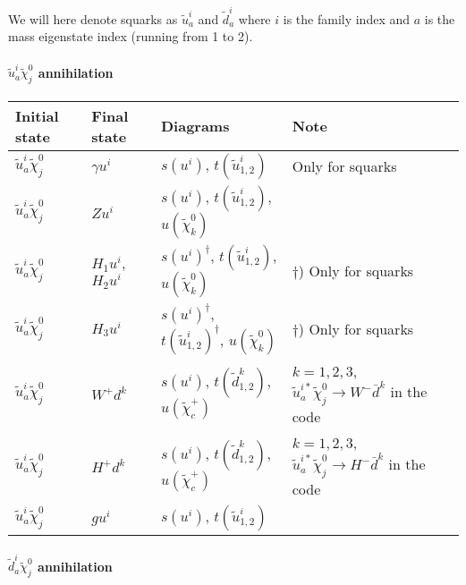 \smallskip


We will here denote squarks as $\tilde{u}^i_a$ and $\tilde{d}^i_a$ where $i$ is the family index and $a$ is the mass eigenstate index (running from 1 to 2).

\paragraph{$\tilde{u}^i_{a} \tilde{\chi}_{j}^{0}$ annihilation}

\begin{center}
\begin{tabular}{llll} \hline
{\bfseries Initial state} & {\bfseries Final state} &
{\bfseries Diagrams} & {\bfseries Note} \\ \hline \tabspace
$\tilde{u}^i_a \tilde{\chi}_{j}^0$ & $\gamma u^i$ &
$s(u^{i})$, $t(\tilde{u}^i_{1,2})$ 
& Only for squarks \\
$\tilde{u}^i_a \tilde{\chi}_{j}^0$ & $Z u^i$ &
$s(u^{i})$, $t(\tilde{u}^i_{1,2})$, $u(\tilde{\chi}_k^0)$ \\
$\tilde{u}^i_a \tilde{\chi}_{j}^0$ & $H_{1} u^i$, $H_{2} u^i$ &
$s(u^{i})^\dagger$, $t(\tilde{u}^i_{1,2})$, $u(\tilde{\chi}_k^0)$
& $\dagger$) Only for squarks \\
$\tilde{u}^i_a \tilde{\chi}_{j}^0$ & $H_{3}u^i$  &
$s(u^{i})^\dagger$, $t(\tilde{u}^i_{1,2})^\dagger$, $u(\tilde{\chi}_k^0)$
& $\dagger$) Only for squarks  \\ 
$\tilde{u}^i_a \tilde{\chi}_{j}^0$ & $W^+ d^k$  &
$s(u^i)$, $t(\tilde{d}^k_{1,2})$, $u(\tilde{\chi}_c^+)$ 
& \parbox[t]{4cm}{$k=1,2,3$, $\tilde{u}^{i*}_a \tilde{\chi}_{j}^0 \to W^- \bar{d}^k$ in the code} \\
$\tilde{u}^i_a \tilde{\chi}_{j}^0$ & $H^+ d^k$  &
$s(u^i)$, $t(\tilde{d}^k_{1,2})$, $u(\tilde{\chi}_c^+)$
& \parbox[t]{4cm}{$k=1,2,3$, $\tilde{u}^{i*}_a \tilde{\chi}_{j}^0 \to H^- \bar{d}^k$ in the code} \\ 
$\tilde{u}^i_a \tilde{\chi}_{j}^0$ & $g u^i$  &
$s(u^i)$, $t(\tilde{u}^i_{1,2})$ \\ \hline
\end{tabular}
\end{center}

\paragraph{$\tilde{d}^i_{a} \tilde{\chi}_{j}^{0}$ annihilation}

